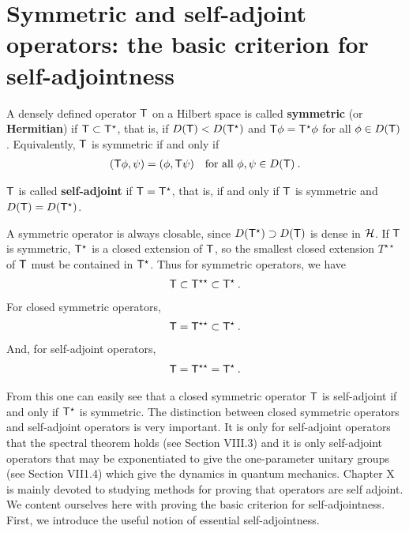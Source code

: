 \section{Symmetric and self-adjoint operators:
the basic criterion for self-adjointness}

\begin{definition}
A densely defined operator $\mathsf{T}$ on a Hilbert space is called \textbf{symmetric} (or \textbf{Hermitian}) if $\mathsf{T} \subset \mathsf{T}^\star$, that is, if $D(\mathsf{T}) < D(\mathsf{T}^\star)$ and $\mathsf{T} \phi = \mathsf{T}^\star \phi$ for all $\phi \in D(\mathsf{T})$. Equivalently, $\mathsf{T}$ is symmetric if and only if
\begin{align}
    (\mathsf{T} \phi, \psi) = (\phi, \mathsf{T} \psi) \quad \text{for all } \phi, \psi \in D (\mathsf{T}) \:.
\end{align}

\end{definition}

\begin{definition}
    $\mathsf{T}$ is called \textbf{self-adjoint} if $\mathsf{T} = \mathsf{T}^\star$, that is, if and only if  $\mathsf{T}$ is symmetric and $D(\mathsf{T}) = D(\mathsf{T}^\star)$.
\end{definition}

A symmetric operator is always closable, since $D(\mathsf{T}^\star) \supset D(\mathsf{T})$ is dense in $\mathcal{H}$. If $\mathsf{T}$ is symmetric, $\mathsf{T}^\star$ is a closed extension of $\mathsf{T}$, so the smallest closed extension $T^{\star \star}$ of $\mathsf{T}$ must be contained in $\mathsf{T}^\star$. Thus for symmetric operators, we have
\begin{align}
    \mathsf{T} \subset \mathsf{T}^{\star \star} \subset \mathsf{T}^\star \:.
\end{align}
For closed symmetric operators, \begin{align}
    \mathsf{T} = \mathsf{T}^{\star\star} \subset \mathsf{T}^\star \:.
\end{align}
And, for self-adjoint operators,
\begin{align}
    \mathsf{T}= \mathsf{T}^{\star \star} = \mathsf{T}^{\star } \:. 
\end{align}

From this one can easily see that a closed symmetric operator $\mathsf{T}$ is self-adjoint if and only if $\mathsf{T}^\star$ is symmetric.
The distinction between closed symmetric operators and self-adjoint operators is very important. It is only for self-adjoint operators that the spectral theorem holds (see Section VIII.3) and it is only self-adjoint operators that may be exponentiated to give the one-parameter unitary groups (see Section VII1.4) which give the dynamics in quantum mechanics. Chapter X is mainly devoted to studying methods for proving that operators are self adjoint. We content ourselves here with proving the basic criterion for self-adjointness. First, we introduce the useful notion of essential self-adjointness.

